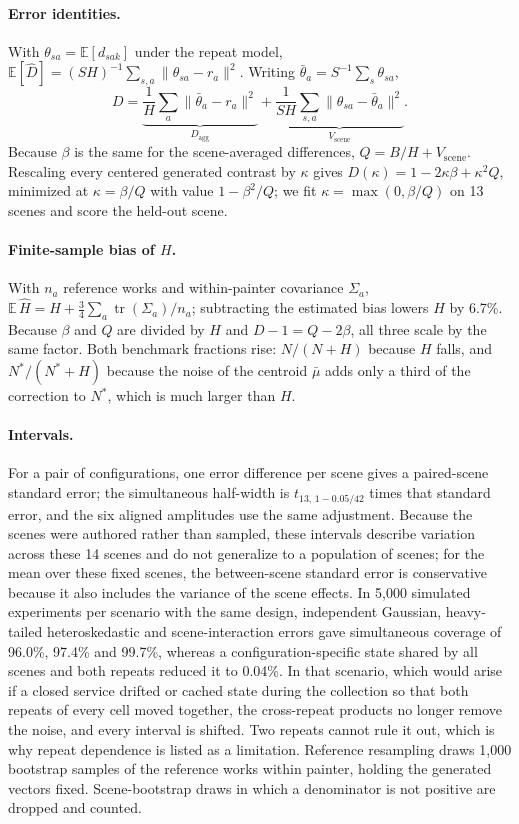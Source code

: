 \paragraph{Error identities.} With $\theta_{sa}=\mathbb E[d_{sak}]$ under the repeat model,
$\mathbb E[\widehat D]=(SH)^{-1}\sum_{s,a}\|\theta_{sa}-r_a\|^2$. Writing
$\bar\theta_a=S^{-1}\sum_s\theta_{sa}$,
\begin{equation}
D=\underbrace{\frac1H\sum_a\|\bar\theta_a-r_a\|^2}_{D_{\mathrm{agg}}}
+\underbrace{\frac{1}{SH}\sum_{s,a}\|\theta_{sa}-\bar\theta_a\|^2}_{V_{\mathrm{scene}}}.
\end{equation}
Because $\beta$ is the same for the scene-averaged differences, $Q=B/H+V_{\mathrm{scene}}$.
Rescaling every centered generated contrast by $\kappa$ gives $D(\kappa)=1-2\kappa\beta+\kappa^2Q$,
minimized at $\kappa=\beta/Q$ with value $1-\beta^2/Q$; we fit $\kappa=\max(0,\beta/Q)$ on 13
scenes and score the held-out scene.

\paragraph{Finite-sample bias of $H$.} With $n_a$ reference works and within-painter covariance
$\Sigma_a$, $\mathbb E\,\widehat H=H+\frac34\sum_a\operatorname{tr}(\Sigma_a)/n_a$; subtracting
the estimated bias lowers $H$ by 6.7\%. Because $\beta$ and $Q$ are divided by $H$ and
$D-1=Q-2\beta$, all three scale by the same factor. Both benchmark fractions rise: $N/(N+H)$
because $H$ falls, and $N^*/(N^*+H)$ because the noise of the centroid $\bar\mu$ adds only a third
of the correction to $N^*$, which is much larger than $H$.

\paragraph{Intervals.} For a pair of configurations, one error difference per scene gives a
paired-scene standard error; the simultaneous half-width is $t_{13,\,1-0.05/42}$ times that
standard error, and the six aligned amplitudes use the same adjustment. Because the scenes were
authored rather than sampled, these intervals describe variation across these 14 scenes and do
not generalize to a population of scenes; for the mean over these fixed scenes, the between-scene
standard error is conservative because it also includes the variance of the scene effects. In
5,000 simulated experiments per scenario with the same
design, independent Gaussian, heavy-tailed heteroskedastic and scene-interaction errors gave
simultaneous coverage of 96.0\%, 97.4\% and 99.7\%, whereas a configuration-specific state
shared by all scenes and both repeats reduced it to 0.04\%. In that scenario, which would arise if a
closed service drifted or cached state during the collection so that both repeats of every cell
moved together, the cross-repeat products no longer remove the noise, and every interval is shifted.
Two repeats cannot rule it out, which is why repeat dependence is listed as a limitation.
Reference resampling draws 1,000 bootstrap samples of the reference works within painter, holding
the generated vectors fixed. Scene-bootstrap draws in which a denominator is not positive are
dropped and counted.

